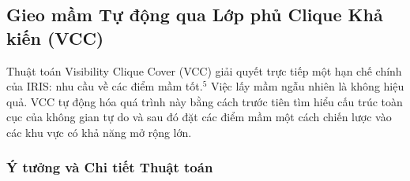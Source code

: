 \documentclass{article}
\begin{document}
\subsection{Gieo mầm Tự động qua Lớp phủ Clique Khả kiến (VCC)}

Thuật toán Visibility Clique Cover (VCC) giải quyết trực tiếp một hạn chế chính của IRIS: nhu cầu về các điểm mầm tốt.$^5$ Việc lấy mầm ngẫu nhiên là không hiệu quả. VCC tự động hóa quá trình này bằng cách trước tiên tìm hiểu cấu trúc toàn cục của không gian tự do và sau đó đặt các điểm mầm một cách chiến lược vào các khu vực có khả năng mở rộng lớn.

\subsubsection{Ý tưởng và Chi tiết Thuật toán}
\end{document}
